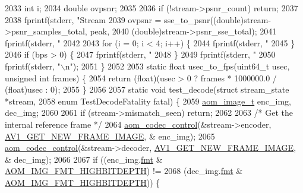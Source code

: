 \begin{DoxyCodeInclude}
{{{{{{{{{{{{{{{{{{{{{{{{{{{{{{{{{{{{{{{{2033   \textcolor{keywordtype}{int} i;
2034   \textcolor{keywordtype}{double} ovpsnr;
2035 
2036   \textcolor{keywordflow}{if} (!stream->psnr\_count) \textcolor{keywordflow}{return};
2037 
2038   fprintf(stderr, \textcolor{stringliteral}{"Stream %
2039   ovpsnr = sse\_to\_psnr((\textcolor{keywordtype}{double})stream->psnr\_samples\_total, peak,
2040                        (\textcolor{keywordtype}{double})stream->psnr\_sse\_total);
2041   fprintf(stderr, \textcolor{stringliteral}{" %
2042 
2043   \textcolor{keywordflow}{for} (i = 0; i < 4; i++) \{
2044     fprintf(stderr, \textcolor{stringliteral}{" %
2045   \}
2046   \textcolor{keywordflow}{if} (bps > 0) \{
2047     fprintf(stderr, \textcolor{stringliteral}{" %
2048   \}
2049   fprintf(stderr, \textcolor{stringliteral}{" %
2050   fprintf(stderr, \textcolor{stringliteral}{"\(\backslash\)n"});
2051 \}
2052 
2053 \textcolor{keyword}{static} \textcolor{keywordtype}{float} usec\_to\_fps(uint64\_t usec, \textcolor{keywordtype}{unsigned} \textcolor{keywordtype}{int} frames) \{
2054   \textcolor{keywordflow}{return} (\textcolor{keywordtype}{float})(usec > 0 ? frames * 1000000.0 / (float)usec : 0);
2055 \}
2056 
2057 \textcolor{keyword}{static} \textcolor{keywordtype}{void} test\_decode(\textcolor{keyword}{struct} stream\_state *stream,
2058                         \textcolor{keyword}{enum} TestDecodeFatality fatal) \{
2059   \hyperlink{structaom__image}{aom\_image\_t} enc\_img, dec\_img;
2060 
2061   \textcolor{keywordflow}{if} (stream->mismatch\_seen) \textcolor{keywordflow}{return};
2062 
2063   \textcolor{comment}{/* Get the internal reference frame */}
2064   \hyperlink{group__codec_ga6da974f4eeaba1fa74106b28d0fe6ac5}{aom\_codec\_control}(&stream->encoder, \hyperlink{group__aom_gga9421a1fa78c0d9587ae5aa6c1cb3d659a410c706a34f5295996658cc5044a700f}{AV1\_GET\_NEW\_FRAME\_IMAGE}, &
      enc\_img);
2065   \hyperlink{group__codec_ga6da974f4eeaba1fa74106b28d0fe6ac5}{aom\_codec\_control}(&stream->decoder, \hyperlink{group__aom_gga9421a1fa78c0d9587ae5aa6c1cb3d659a410c706a34f5295996658cc5044a700f}{AV1\_GET\_NEW\_FRAME\_IMAGE}, &
      dec\_img);
2066 
2067   \textcolor{keywordflow}{if} ((enc\_img.\hyperlink{structaom__image_a6c64b1ab918d80d52eb8f5d6d957e825}{fmt} & \hyperlink{aom__image_8h_a607b37d91f75442f54223ecd85f1b6cb}{AOM\_IMG\_FMT\_HIGHBITDEPTH}) !=
2068       (dec\_img.\hyperlink{structaom__image_a6c64b1ab918d80d52eb8f5d6d957e825}{fmt} & \hyperlink{aom__image_8h_a607b37d91f75442f54223ecd85f1b6cb}{AOM\_IMG\_FMT\_HIGHBITDEPTH})) \{
}}}}}}}}}}}}}}}}}}}}}}}}}}}}}}}}}}}}}}}}}}}}}
\end{DoxyCodeInclude}
